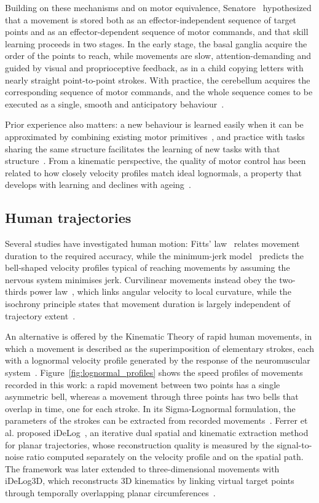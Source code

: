 \documentclass[12pt]{report}
\begin{document}
Building on these mechanisms and on motor equivalence, Senatore~\cite{senatore2012} hypothesized that a movement is stored both as an effector-independent sequence of target points and as an effector-dependent sequence of motor commands, and that skill learning proceeds in two stages. In the early stage, the basal ganglia acquire the order of the points to reach, while movements are slow, attention-demanding and guided by visual and proprioceptive feedback, as in a child copying letters with nearly straight point-to-point strokes. With practice, the cerebellum acquires the corresponding sequence of motor commands, and the whole sequence comes to be executed as a single, smooth and anticipatory behaviour~\cite[pp.~34--38, 56--58]{senatore2012}.

Prior experience also matters: a new behaviour is learned easily when it can be approximated by combining existing motor primitives~\cite[p.~734]{wolpert2021}, and practice with tasks sharing the same structure facilitates the learning of new tasks with that structure~\cite{braun2009}. From a kinematic perspective, the quality of motor control has been related to how closely velocity profiles match ideal lognormals, a property that develops with learning and declines with ageing~\cite{plamondon2013}.
\subsection{Human trajectories}
Several studies have investigated human motion: Fitts' law~\cite{fitts1954} relates movement duration to the required accuracy, while the minimum-jerk model~\cite{flash1985} predicts the bell-shaped velocity profiles typical of reaching movements by assuming the nervous system minimises jerk. Curvilinear movements instead obey the two-thirds power law~\cite{lacquaniti1983}, which links angular velocity to local curvature, while the isochrony principle states that movement duration is largely independent of trajectory extent~\cite{viviani1995}.

An alternative is offered by the Kinematic Theory of rapid human movements, in which a movement is described as the superimposition of elementary strokes, each with a lognormal velocity profile generated by the response of the neuromuscular system~\cite{plamondon1995a,plamondon1995b}. Figure~\ref{fig:lognormal_profiles} shows the speed profiles of movements recorded in this work: a rapid movement between two points has a single asymmetric bell, whereas a movement through three points has two bells that overlap in time, one for each stroke. In its Sigma-Lognormal formulation, the parameters of the strokes can be extracted from recorded movements~\cite{oreilly2009}. Ferrer et al. proposed iDeLog~\cite{idelog}, an iterative dual spatial and kinematic extraction method for planar trajectories, whose reconstruction quality is measured by the signal-to-noise ratio computed separately on the velocity profile and on the spatial path. The framework was later extended to three-dimensional movements with iDeLog3D, which reconstructs 3D kinematics by linking virtual target points through temporally overlapping planar circumferences~\cite{idelog3d}.
\end{document}
